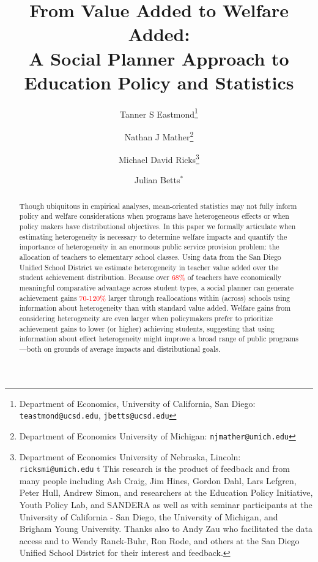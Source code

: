 \documentclass[12pt]{article}
\title{From Value Added to Welfare Added: \\ A Social Planner Approach to Education Policy and Statistics}
\author{Tanner S Eastmond\thanks{Department of Economics, University of California, San Diego: \texttt{teastmond@ucsd.edu}, \texttt{jbetts@ucsd.edu}} \and Nathan J Mather\thanks{Department of Economics University of Michigan: \texttt{njmather@umich.edu}} \and Michael David Ricks\thanks{Department of Economics University of Nebraska, Lincoln: \texttt{ricksmi@umich.edu} \hspace{11em} {\color{white}t} This research is the product of feedback and from many people including Ash Craig, Jim Hines, Gordon Dahl, Lars Lefgren, Peter Hull, %
Andrew Simon, and  researchers at the Education Policy Initiative, Youth Policy Lab, and SANDERA as well as with seminar participants at the University of California - San Diego, the University of Michigan, and Brigham Young University. Thanks also to Andy Zau who facilitated the data access and to  Wendy Ranck-Buhr, Ron Rode, and others at the San Diego Unified School District for their interest and feedback.} \and Julian Betts$^*$}
\theoremstyle{definition}
\theoremstyle{definition}
\theoremstyle{definition}
\theoremstyle{definition}
\begin{document}
\maketitle

\begin{abstract}

Though ubiquitous in empirical analyses, mean-oriented statistics may not fully inform policy and welfare considerations when programs have heterogeneous effects or when policy makers have distributional objectives. In this paper we formally articulate when estimating heterogeneity is necessary to determine welfare impacts and  quantify the importance of heterogeneity in an enormous public service provision problem: the allocation of teachers to elementary school classes. Using data from the San Diego Unified School District we estimate heterogeneity in teacher value added over the student achievement distribution. Because over \textcolor{red}{68\%} of teachers have economically meaningful comparative advantage across student types, a social planner can generate achievement gains \textcolor{red}{70-120\%} larger through reallocations within (across) schools using information about heterogeneity than with standard value added. Welfare gains from considering heterogeneity are even larger when policymakers prefer to prioritize achievement gains to lower (or higher) achieving students, suggesting that using information about effect heterogeneity might improve a broad range of public programs---both on grounds of average impacts and distributional goals.





\end{abstract}
\end{document}
